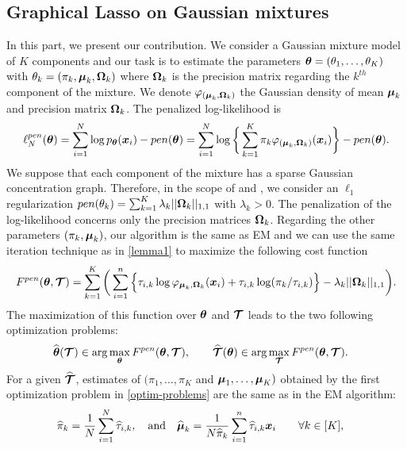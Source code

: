\subsection{Graphical Lasso on Gaussian mixtures}
In this part, we present our contribution. We consider a Gaussian mixture model of $K$ components and our task is to estimate the parameters ${\boldsymbol\theta}=(\theta_1,\dots,\theta_K)$ with $\theta_k=(\pi_k, \boldsymbol\mu_k, \boldsymbol\Omega_k)$ where $\boldsymbol\Omega_k$ is the precision matrix regarding the $k^{th}$ component of the mixture. We denote $\varphi_{(\boldsymbol\mu_{k},\boldsymbol\Omega_{k})}$ the Gaussian density of mean $\boldsymbol\mu_k$ and precision matrix $\boldsymbol\Omega_k$. The penalized log-likelihood is
\begin{equation}
\label{pen-log-likelihood}
\ell_N^{pen}({\boldsymbol\theta})=\sum_{i=1}^{N}\log p_{{\boldsymbol\theta}}(\boldsymbol x_i)-pen({\boldsymbol\theta})= \sum_{i=1}^{N}\log \bigg\{ \sum_{k=1}^K\pi_k\varphi_{(\boldsymbol\mu_{k},\boldsymbol\Omega_{k})}(\boldsymbol x_i)\bigg\} -pen({\boldsymbol\theta}).
\end{equation}
We suppose that each component of the mixture has a sparse Gaussian concentration graph. Therefore, in the scope of \citep{banerjee} and \citep{glasso07}, we consider an $\ell_1$ regularization $pen(\theta_k)=\sum_{k=1}^K\lambda_k||\boldsymbol\Omega_k||_{1,1}$ with $\lambda_k >0$. The penalization of the log-likelihood concerns only the precision matrices $\boldsymbol\Omega_k$. Regarding the other parameters $(\pi_k, \boldsymbol\mu_k)$, our algorithm is the same as EM and we can use the same iteration technique as in \cref{lemma1} to maximize the following cost function
\begin{equation}
\label{cost_fun_pen}
F^{pen}({\boldsymbol\theta},\boldsymbol{\mathcal T})  = \sum_{k=1}^K \bigg(\sum_{i=1}^{n} \Big\{\tau_{i,k}\log\varphi_{\boldsymbol\mu_{k},\boldsymbol\Omega_{k}}(\boldsymbol x_i)+\tau_{i,k}
    \log(\pi_k/\tau_{i,k})\Big\}-\lambda_k||\boldsymbol\Omega_k||_{1,1}\bigg).
\end{equation}
The maximization of this function over ${\boldsymbol\theta}$ and $\boldsymbol{\mathcal T}$ leads to the two following optimization problems:
\begin{align}
\label{optim-problems}
\widehat{{\boldsymbol\theta}}(\boldsymbol{\mathcal T})&\in \arg\max_{{\boldsymbol\theta}} F^{pen}({\boldsymbol\theta},\boldsymbol{\mathcal T}),\qquad \widehat{\boldsymbol{\mathcal T}}({\boldsymbol\theta})\in \arg\max_{\boldsymbol{\mathcal T}} F^{pen}({\boldsymbol\theta},\boldsymbol{\mathcal T}).
\end{align}
For a given $\widehat{\boldsymbol{\mathcal T}}$, estimates of $(\pi_1,\dots,\pi_K$ and $\boldsymbol\mu_1,\dots,\boldsymbol\mu_K)$ obtained by the first optimization problem in \cref{optim-problems} are the same as in the EM algorithm:
\begin{align}
\label{em-sols}
\widehat\pi_k     &= \frac1N\sum_{i=1}^N \widehat\tau_{i,k},\quad\text{and}\quad\widehat{\boldsymbol\mu}_k = \frac1{N\widehat\pi_k}\sum_{i=1}^n \widehat\tau_{i,k}\boldsymbol x_i \qquad \forall k\in[K],
\end{align}
